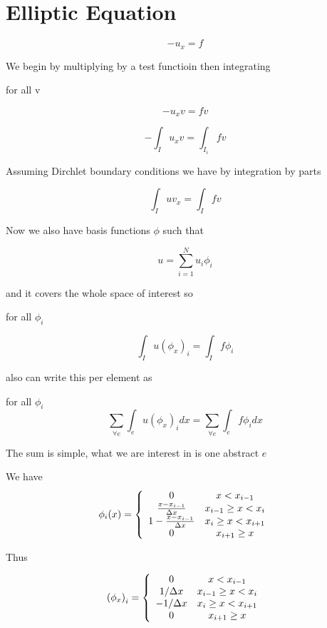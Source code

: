 \documentclass[12pt]{article}
\begin{document}
\section{Elliptic Equation}
\[-u_x = f\]

We begin by multiplying by a test functioin then integrating

for all v

\[-u_x v = fv\]

\[-\int_{I} u_x v = \int_{I_{i}}fv\]

Assuming Dirchlet boundary conditions we have by integration by parts


\[\int_I u v_x = \int_Ifv\]

Now we also have basis functions $\phi$ such that

$$u = \sum^N_{i=1} u_i \phi_i$$

and it covers the whole space of interest so

for all $\phi_i$

\[\int_I u (\phi_x)_i = \int_If\phi_i\]

also can write this per element as

for all $\phi_i$
\[\sum_{\forall e} \int_e u (\phi_x)_i dx =  \sum_{\forall e} \int_ef\phi_i dx \]

The sum is simple, what we are interest in is one abstract $e$

We have 
\[\phi_i(x) = \left\lbrace \begin{array}{c c}
0 & x < x_{i-1}\\
\frac{x - x_{i-1}}{\Delta x} & x_{i-1}\ge x < x_{i}\\
1 - \frac{x - x_{i-1}}{\Delta x} & x_{i}\ge x < x_{i+1}\\
0 & x_{i+1}\ge x
\end{array} \right.\]

Thus

\[{(\phi_x)}_i = \left\lbrace \begin{array}{c c}
0 & x < x_{i-1}\\
1/\Delta x & x_{i-1}\ge x < x_{i}\\
- 1/\Delta x& x_{i}\ge x < x_{i+1}\\
0 & x_{i+1}\ge x
\end{array} \right.\]
\end{document}
